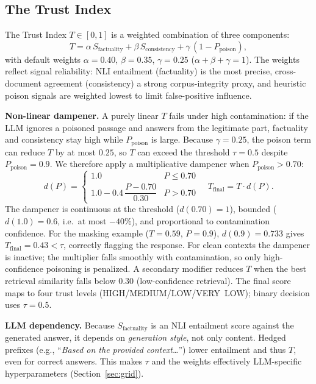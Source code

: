 \subsection{The Trust Index}
The Trust Index $T\in[0,1]$ is a weighted combination of three components:
\begin{equation}
\label{eq:trust}
T = \alpha\,S_{\text{factuality}} + \beta\,S_{\text{consistency}} + \gamma\,(1 - P_{\text{poison}}),
\end{equation}
with default weights $\alpha{=}0.40$, $\beta{=}0.35$, $\gamma{=}0.25$ ($\alpha{+}\beta{+}\gamma{=}1$).  The weights reflect signal reliability: NLI entailment (factuality) is the most precise, cross-document agreement (consistency) a strong corpus-integrity proxy, and heuristic poison signals are weighted lowest to limit false-positive influence. 

\textbf{Non-linear dampener.} A purely linear $T$ fails under high contamination: if the LLM ignores a poisoned passage and answers from the legitimate part, factuality and consistency stay high while $P_{\text{poison}}$ is large. Because $\gamma{=}0.25$, the poison term can reduce $T$ by at most $0.25$, so $T$ can exceed the threshold $\tau{=}0.5$ despite $P_{\text{poison}} {=}0.9$. We therefore apply a multiplicative dampener when $P_{\text{poison}}>0.70$:
\begin{equation}
\label{eq:damp}
d(P) =
\begin{cases}
1.0 & P \le 0.70\\[2pt]
1.0 - 0.4\,\dfrac{P-0.70}{0.30} & P > 0.70
\end{cases}
\quad T_{\text{final}} = T\cdot d(P).
\end{equation}
The dampener is continuous at the threshold ($d(0.70){=}1$), bounded ($d(1.0){=}0.6$, i.e.\ at most $-40\%$), and proportional to contamination confidence. For the masking example ($T{=}0.59$, $P{=}0.9$), $d(0.9){=}0.733$ gives $T_{\text{final}}{=}0.43<\tau$, correctly flagging the response. For clean contexts the dampener is inactive; the multiplier falls smoothly with contamination, so only high-confidence poisoning is penalized. A secondary modifier reduces $T$ when the best retrieval similarity falls below $0.30$ (low-confidence retrieval). The final score maps to four trust levels (HIGH/MEDIUM/LOW/VERY~LOW); binary decision uses $\tau{=}0.5$.

\textbf{LLM dependency.} Because $S_{\text{factuality}}$ is an NLI entailment score against the generated answer, it depends on \emph{generation style}, not only content. Hedged prefixes (e.g., ``\emph{Based on the provided context\dots}'') lower entailment and thus $T$, even for correct answers. This makes $\tau$ and the weights effectively LLM-specific hyperparameters (Section~\ref{sec:grid}).
